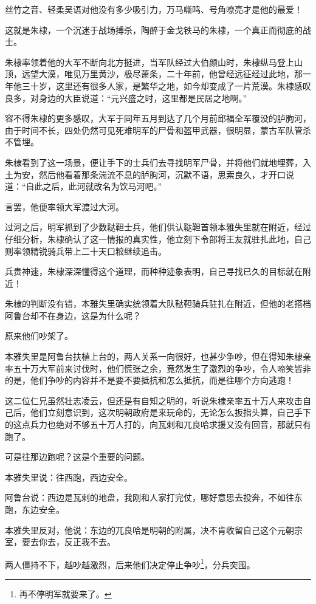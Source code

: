 \begin{multicols}{\theparacolNo}
丝竹之音、轻柔吴语对他没有多少吸引力，万马嘶鸣、号角嘹亮才是他的最爱！

这就是朱棣，一个沉迷于战场搏杀，陶醉于金戈铁马的朱棣，一个真正而彻底的战士。

朱棣率领着他的大军不断向北方挺进，当军队经过大伯颜山时，朱棣纵马登上山顶，远望大漠，唯见万里黄沙，极尽萧条，二十年前，他曾经远征经过此地，那一年他三十岁，这里还有很多人家，是繁华之地，如今却变成了一片荒漠。朱棣感叹良多，对身边的大臣说道：“元兴盛之时，这里都是民居之地啊。”

容不得朱棣的更多感叹，大军于同年五月到达了几个月前邱福全军覆没的胪朐河，由于时间不长，四处仍然可见死难明军的尸骨和盔甲武器，很明显，蒙古军队管杀不管埋。

朱棣看到了这一场景，便让手下的士兵们去寻找明军尸骨，并将他们就地埋葬，入土为安，然后他看着那条湍流不息的胪朐河，沉默不语，思索良久，才开口说道：“自此之后，此河就改名为饮马河吧。”

言罢，他便率领大军渡过大河。

过河之后，明军抓到了少数鞑靼士兵，他们供认鞑靼首领本雅失里就在附近，经过仔细分析，朱棣确认了这一情报的真实性，他立刻下令部将王友就驻扎此地，自己则率领精锐骑兵带上二十天口粮继续追击。

兵贵神速，朱棣深深懂得这个道理，而种种迹象表明，自己寻找已久的目标就在附近！

朱棣的判断没有错，本雅失里确实统领着大队鞑靼骑兵驻扎在附近，但他的老搭档阿鲁台却不在身边，这是为什么呢？

原来他们吵架了。

本雅失里是阿鲁台扶植上台的，两人关系一向很好，也甚少争吵，但在得知朱棣亲率五十万大军前来讨伐时，他们慌张之余，竟然发生了激烈的争吵，令人啼笑皆非的是，他们争吵的内容并不是要不要抵抗和怎么抵抗，而是往哪个方向逃跑！

这二位仁兄虽然壮志凌云，但还是有自知之明的，听说朱棣亲率五十万人来攻击自己后，他们立刻意识到，这次明朝政府是来玩命的，无论怎么扳指头算，自己手下的这点兵力也绝对不够五十万人打的，向瓦剌和兀良哈求援又没有回音，那就只有跑了。

可是往那边跑呢？这是个重要的问题。

本雅失里说：往西跑，西边安全。

阿鲁台说：西边是瓦剌的地盘，我刚和人家打完仗，哪好意思去投奔，不如往东跑，东边安全。

本雅失里反对，他说：东边的兀良哈是明朝的附属，决不肯收留自己这个元朝宗室，要去你去，反正我不去。

两人僵持不下，越吵越激烈，后来他们决定停止争吵\footnote{再不停明军就要来了。}，分兵突围。


\end{multicols}
